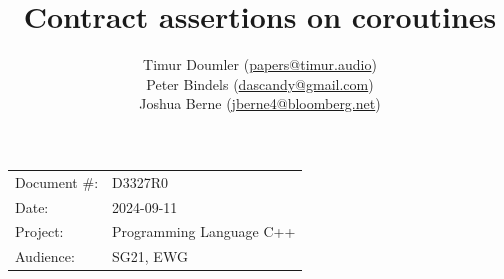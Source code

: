 

 \usepackage[bottom]{footmisc} 

 \usepackage{longtable}


\usepackage{tikz,lipsum,lmodern}
\usepackage[most]{tcolorbox}



\usepackage{titlesec}
\usepackage{tocloft}


\newcommand{\changelocaltocdepth}[1]{%
  \addtocontents{toc}{\protect\setcounter{tocdepth}{#1}}%
  \setcounter{tocdepth}{#1}%
}

\setcounter{tocdepth}{3}



\title{Contract assertions on coroutines}
\author{
Timur Doumler \small(\href{mailto:papers@timur.audio}{papers@timur.audio}) \\
Peter Bindels \small(\href{mailto:dascandy@gmail.com}{dascandy@gmail.com}) \\
Joshua Berne \small(\href{mailto:jberne4@bloomberg.net}{jberne4@bloomberg.net}) 
}
\date{}
\maketitle

\begin{tabular}{ll}
Document \#: & D3327R0 \\
Date: &2024-09-11 \\
Project: & Programming Language C++ \\
Audience: & SG21, EWG
\end{tabular}

